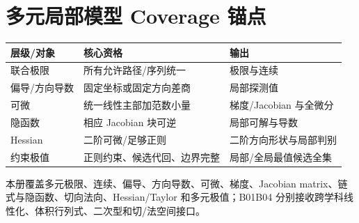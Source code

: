 \documentclass[11pt,a4paper,fontset=fandol]{ctexart}
\begin{document}
\section{多元局部模型 Coverage 锚点}
\begin{center}
\begin{tabular}{L{2.55cm}L{5.15cm}L{\dimexpr\linewidth-7.70cm\relax}}
\toprule
层级/对象 & 核心资格 & 输出\\
\midrule
联合极限 & 所有允许路径/序列统一 & 极限与连续\\
偏导/方向导数 & 固定坐标或固定方向差商 & 局部探测值\\
可微 & 统一线性主部加范数小量 & 梯度/Jacobian 与全微分\\
隐函数 & 相应 Jacobian 块可逆 & 局部可解与导数\\
Hessian & 二阶可微/足够正则 & 二阶方向形状与局部判别\\
约束极值 & 正则约束、候选代回、边界完整 & 局部/全局最值候选全集\\
\bottomrule
\end{tabular}
\end{center}

本册覆盖多元极限、连续、偏导、方向导数、可微、梯度、Jacobian matrix、链式与隐函数、切向法向、Hessian/Taylor 和多元极值；B01\textendash{}B04 分别接收跨学科线性化、体积行列式、二次型和切/法空间接口。
\end{document}
